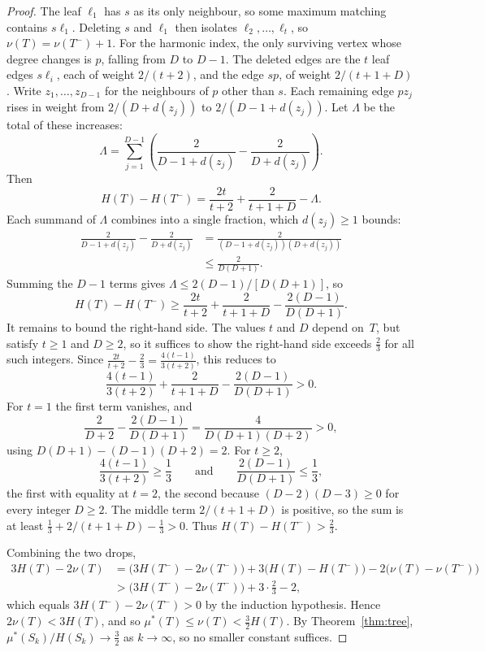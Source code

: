 \documentclass[11pt]{article}
\theoremstyle{definition}
\theoremstyle{remark}
\newcommand{\mustar}{\mu^{*}}
\begin{document}
\begin{proof}
The leaf $\ell_1$ has $s$ as its only neighbour, so some maximum matching
contains $s\ell_1$.  Deleting $s$ and $\ell_1$ then isolates
$\ell_2, \ldots, \ell_t$, so $\nu(T) = \nu(T^-) + 1$.  For the harmonic
index, the only surviving vertex whose degree changes is $p$, falling from
$D$ to $D-1$.  The deleted edges are the $t$ leaf edges $s\ell_i$, each of
weight $2/(t+2)$, and the edge $sp$, of weight $2/(t+1+D)$.  Write
$z_1, \ldots, z_{D-1}$ for the neighbours of $p$ other than $s$.  Each
remaining edge $pz_j$ rises in weight from $2/(D+d(z_j))$ to
$2/(D-1+d(z_j))$.  Let $\Lambda$ be the total of these increases:
\[
  \Lambda = \sum_{j=1}^{D-1}
      \left( \frac{2}{D-1+d(z_j)} - \frac{2}{D+d(z_j)} \right).
\]
Then
\[
  H(T) - H(T^-) = \frac{2t}{t+2} + \frac{2}{t+1+D} - \Lambda.
\]
Each summand of $\Lambda$ combines into a single fraction, which $d(z_j) \ge 1$
bounds:
\begin{align*}
  \frac{2}{D-1+d(z_j)} - \frac{2}{D+d(z_j)}
    &= \frac{2}{(D-1+d(z_j))(D+d(z_j))} \\
    &\le \frac{2}{D(D+1)}.
\end{align*}
Summing the $D-1$ terms gives $\Lambda \le 2(D-1)/[D(D+1)]$, so
\[
  H(T) - H(T^-) \ge \frac{2t}{t+2} + \frac{2}{t+1+D}
                     - \frac{2(D-1)}{D(D+1)}.
\]
It remains to bound the right-hand side.  The values $t$ and $D$ depend
on~$T$, but satisfy $t \ge 1$ and $D \ge 2$, so it suffices to show the
right-hand side exceeds $\tfrac{2}{3}$ for all such integers.  Since
$\tfrac{2t}{t+2} - \tfrac{2}{3} = \tfrac{4(t-1)}{3(t+2)}$, this reduces to
\[
  \frac{4(t-1)}{3(t+2)} + \frac{2}{t+1+D}
    - \frac{2(D-1)}{D(D+1)} > 0.
\]
For $t = 1$ the first term vanishes, and
\[
  \frac{2}{D+2} - \frac{2(D-1)}{D(D+1)} = \frac{4}{D(D+1)(D+2)} > 0,
\]
using $D(D+1) - (D-1)(D+2) = 2$.  For $t \ge 2$,
\[
  \frac{4(t-1)}{3(t+2)} \ge \frac{1}{3}
  \qquad\text{and}\qquad
  \frac{2(D-1)}{D(D+1)} \le \frac{1}{3},
\]
the first with equality at $t = 2$, the second because
$(D-2)(D-3) \ge 0$ for every integer $D \ge 2$.  The middle term
$2/(t+1+D)$ is positive, so the sum is at least
$\tfrac{1}{3} + 2/(t+1+D) - \tfrac{1}{3} > 0$.  Thus
$H(T) - H(T^-) > \tfrac{2}{3}$.

Combining the two drops,
\begin{align*}
  3H(T) - 2\nu(T)
    &= \bigl(3H(T^-) - 2\nu(T^-)\bigr)
      + 3\bigl(H(T) - H(T^-)\bigr) - 2\bigl(\nu(T) - \nu(T^-)\bigr) \\
    &> \bigl(3H(T^-) - 2\nu(T^-)\bigr) + 3 \cdot \tfrac{2}{3} - 2,
\end{align*}
which equals $3H(T^-) - 2\nu(T^-) > 0$ by the induction hypothesis.  Hence
$2\nu(T) < 3H(T)$, and so $\mustar(T) \le \nu(T) < \tfrac{3}{2} H(T)$.
By Theorem~\ref{thm:tree}, $\mustar(S_k)/H(S_k) \to \tfrac{3}{2}$ as
$k \to \infty$, so no smaller constant suffices.
\end{proof}
\end{document}
